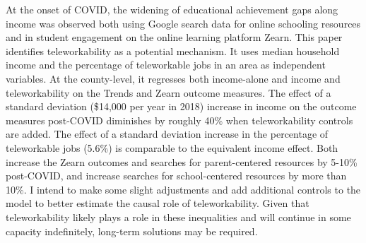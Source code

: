 At the onset of COVID, the widening of educational achievement gaps along income was observed both using Google search data for online schooling resources and in student engagement on the online learning platform Zearn.
This paper identifies teleworkability as a potential mechanism.
It uses median household income and the percentage of teleworkable jobs in an area as independent variables.
At the county-level, it regresses both income-alone and income and teleworkability on the Trends and Zearn outcome measures.
The effect of a standard deviation (\$14,000 per year in 2018) increase in income on the outcome measures post-COVID diminishes by roughly 40\% when teleworkability controls are added.
The effect of a standard deviation increase in the percentage of teleworkable jobs (5.6\%) is comparable to the equivalent income effect.
Both increase the Zearn outcomes and searches for parent-centered resources by 5-10\% post-COVID, and increase searches for school-centered resources by more than 10\%.
I intend to make some slight adjustments and add additional controls to the model to better estimate the causal role of teleworkability.
Given that teleworkability likely plays a role in these inequalities and will continue in some capacity indefinitely, long-term solutions may be required.

